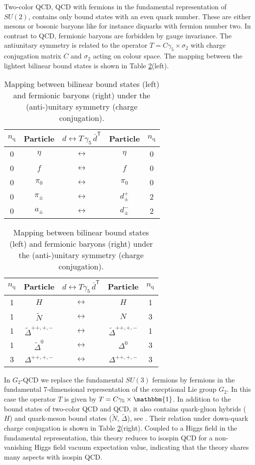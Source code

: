 \documentclass{PoS}
\newcommand{\id}{\mathbbm{1}}
\newcommand{\trnsp}{\mathsf{T}}
\begin{document}
Two-color QCD, QCD with fermions in the fundamental representation of $SU(2)$, contains only bound states with an even quark number. 
These are either mesons or bosonic baryons like for instance diquarks with fermion
number two. In contrast to QCD, fermionic baryons are forbidden by gauge invariance. The antiunitary symmetry is related to the operator
$T=C \gamma_5 \times \sigma_2$ with charge conjugation matrix $C$ and $\sigma_2$ acting on colour space. The mapping between the lightest bilinear bound states is shown in Table \ref{su2map}(left).
\begin{table}[htb]
\begin{tabular}{|c|c|c|c|c|}
\hline $n_\text{q}$ & Particle & $d \leftrightarrow T\, \gamma_5 \, \bar{d}^\trnsp$ & Particle & $n_\text{q}$ \\
\hline
\hline 0  & $\eta$&  $\leftrightarrow$ & $\eta$ & 0 \\
\hline 0  & $f$&  $\leftrightarrow$ & $f$ & 0 \\
\hline 0  & $\pi_0$&  $\leftrightarrow$ & $\pi_0$ & 0 \\
\hline
\hline 0  & $\pi_{\pm}$&  $\leftrightarrow$ & $d_{\pm}^{+}$ & 2 \\
\hline 0  & $a_{\pm}$&  $\leftrightarrow$ & $d_{\pm}^{-}$ & 2 \\
\hline
\end{tabular}\hskip5mm
\begin{tabular}{|c|c|c|c|c|}
\hline $n_\text{q}$ & Particle & $d \leftrightarrow T \gamma_5 \, \bar{d}^\trnsp$ & Particle & $n_\text{q}$ \\
\hline
\hline 1 & $H$&  $\leftrightarrow$ & $H$ & 1 \\
\hline 1 & $\tilde{N}$&  $\leftrightarrow$ & $N$ & 3\\
\hline 1 & $\tilde{\Delta}^{++,+,-}$&  $\leftrightarrow$ & $\tilde{\Delta}^{++,+,-}$ & 1\\
\hline 1 & $\tilde{\Delta}^0$&  $\leftrightarrow$ & $\Delta^0$ & 3\\
\hline 3 & $\Delta^{++,+,-}$&  $\leftrightarrow$ & $\Delta^{++,+,-}$ & 3\\
\hline
\end{tabular}
\caption{Mapping between bilinear bound states (left) and fermionic baryons (right) under the (anti-)unitary symmetry (charge conjugation).}
\label{su2map}
\end{table}

In $G_2$-QCD we replace the fundamental $SU(3)$ fermions by fermions in the fundamental $7$-dimensional representation of the execptional Lie group $G_2$. In this case the operator $T$ is given by $T=C \gamma_5 \times \id$. In addition to the bound states of two-color QCD and QCD, it also contains
quark-gluon hybrids ($H$) and quark-meson bound states ($\tilde{N}$, $\tilde{\Delta}$), see \cite{Wellegehausen:2015iea}. Their relation under down-quark charge conjugation is shown in Table \ref{su2map}(right). 
Coupled to a Higgs field in the fundamental representation, this theory reduces to isospin QCD for a non-vanishing Higgs field vacuum expectation value, indicating that the theory shares many aspects with isospin QCD.
\end{document}
